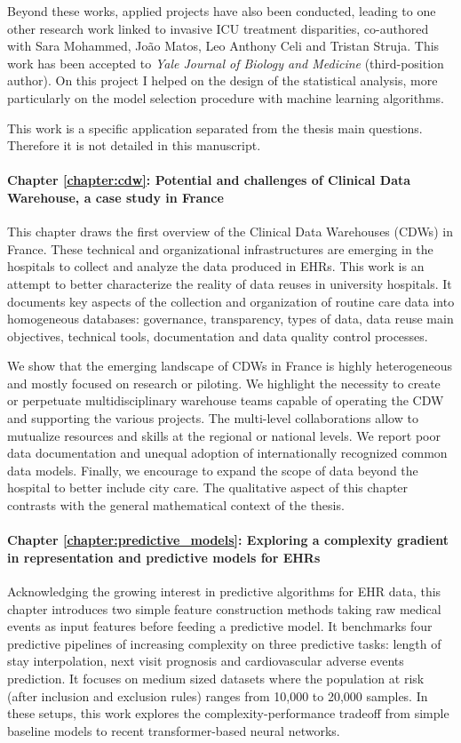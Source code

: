 \documentclass[french,12pt,twoside,a4paper]{book}
\begin{document}
Beyond these works, applied projects have also been conducted, leading to one
other research work linked to invasive ICU treatment disparities, co-authored
with Sara Mohammed, João Matos, Leo Anthony Celi and Tristan Struja. This work
has been accepted to \emph{Yale Journal of Biology and Medicine} (third-position
author). On this project I helped on the design of the statistical analysis,
more particularly on the model selection procedure with machine learning
algorithms.

This work is a specific application separated from the thesis main questions.
Therefore it is not detailed in this manuscript.


\paragraph{Chapter \ref{chapter:cdw}: Potential and challenges of Clinical Data
  Warehouse, a case study in France} This chapter draws the first overview of
the Clinical Data Warehouses (CDWs) in France. These technical and
organizational infrastructures are emerging in the hospitals to collect and
analyze the data produced in EHRs. This work is an
attempt to better characterize the reality of data reuses in university
hospitals. It documents key aspects of the collection and organization of
routine care data into homogeneous databases: governance, transparency, types
of data, data reuse main objectives, technical tools, documentation and data
quality control processes.

We show that the emerging landscape of CDWs in France is highly heterogeneous
and mostly focused on research or piloting. We highlight the necessity to
create or perpetuate multidisciplinary warehouse teams capable of operating
the CDW and supporting the various projects. The multi-level collaborations
allow to mutualize resources and skills at the regional or national levels. We
report poor data documentation and unequal adoption of internationally
recognized common data models. Finally, we encourage to expand the scope of
data beyond the hospital to better include city care. The qualitative aspect
of this chapter contrasts with the general mathematical context of the thesis.

\paragraph{Chapter \ref{chapter:predictive_models}: Exploring a complexity
  gradient in representation and predictive models for EHRs} Acknowledging
the growing interest in predictive algorithms for EHR data, this chapter
introduces two simple feature construction methods taking raw medical events
as input features before feeding a predictive model. It benchmarks four
predictive pipelines of increasing
complexity on three predictive tasks: length of stay interpolation, next visit
prognosis and cardiovascular adverse events prediction. It focuses on medium
sized datasets where the population at risk (after inclusion and exclusion
rules) ranges from 10,000 to 20,000 samples. In these setups, this work
explores the complexity-performance tradeoff from simple baseline models to
recent transformer-based neural networks.
\end{document}
